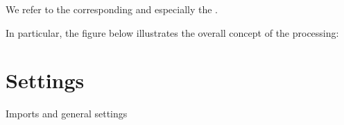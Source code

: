 \documentclass[letterpaper,10pt,english]{jupyterBook}
\begin{document}
\sphinxAtStartPar
We refer to the corresponding  and especially the .

\sphinxAtStartPar
In particular, the figure below illustrates the overall concept of the processing:



\section{Settings}
\label{\detokenize{CIMR_L2_Sea_Ice_Drift_performanceAssessment:settings}}
\sphinxAtStartPar
Imports and general settings
\end{document}
